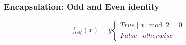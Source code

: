 \documentclass{article}
\begin{document}
\subsubsection{Encapsulation: Odd and Even identity}
\begin{equation}
	f_{\not O\not E}(x) = y
	\begin{cases} True  \mid x \mod 2 = 0\\
	False \mid otherwise\end{cases}
\end{equation}
\end{document}
